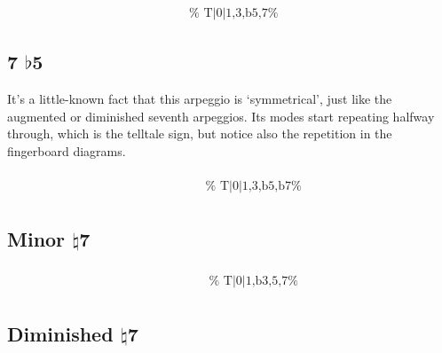 \documentclass[english]{./gbook}
\begin{document}
\begin{large}
\[\begin{array}{ll}
&
	\text{
	}
\end{array}
\]


\subsection*{7 $\flat$5}

It's a little-known fact that this arpeggio is `symmetrical', just like the augmented or diminished seventh arpeggios. Its modes start repeating halfway through, which is the telltale sign, but notice also the repetition in the fingerboard diagrams.

\[
\begin{array}{ll}
	\begin{array}{c}
		\begin{array}{ccc}
			&%
			&%
		\end{array}
		\\
		\begin{array}{cc}
			&%
		\end{array}
	\end{array}

&
	\text{
	}
\end{array}
\]


\subsection*{Minor $\natural$7}

\[
\begin{array}{ll}
	\begin{array}{c}
		\begin{array}{ccc}
			&%
			&%
		\end{array}
		\\
		\begin{array}{cc}
			&%
		\end{array}
	\end{array}

&
	\text{
	}
\end{array}
\]

\subsection*{Diminished $\natural$7}

\[
\begin{array}{ll}
	\begin{array}{c}
		\begin{array}{ccc}
			&%
			&%
		\end{array}
		\\
		\begin{array}{cc}
			&%
		\end{array}
	\end{array}


\end{array}\]
\end{large}
\end{document}
